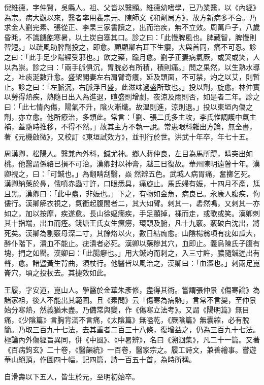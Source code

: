 \begin{pinyinscope}
倪維德，字仲賢，吳縣人。祖、父皆以醫顯。維德幼嗜學，已乃業醫，以《內經》為宗。病大觀以來，醫者率用裴宗元、陳師文《和劑局方》，故方新病多不合。乃求金人劉完素、張從正、李杲三家書讀之，出而治疾，無不立效。周萬戶子，八歲昏眊，不識饑飽寒暑，以土炭自塞其口。診之曰：「此慢脾風也。脾藏智，脾慢則智短。」以疏風助脾劑投之，即愈。顧顯卿右耳下生癭，大與首同，痛不可忍。診之曰：「此手足少陽經受邪也。」飲之藥，踰月愈。劉子正妻病氣厥，或哭或笑，人以為崇。診之曰：「兩手脈俱沉，胃脘必有所積，積則痛。」問之果然，以生熟水導之，吐痰涎數升愈。盛架閣妻左右肩臂奇癢，延及頭面，不可禁，灼之以艾，則暫止。診之曰：「左脈沉，右脈浮且盛，此滋味過盛所致也。」投以劑，旋愈。林仲實以勞得熱疾，熱隨日出入為進退，暄盛則增劇，夜涼及雨則否，如是者二年。診之曰：「此七情內傷，陽氣不升，陰火漸熾。故溫則進，涼則退。」投以東垣內傷之劑，亦立愈。他所療治，多類此。常言：「劉、張二氏多主攻，李氏惟調護中氣主補，蓋隨時推移，不得不然。」故其主方不執一說。常患眼科雜出方論，無全書，著《元機啟微》，又校訂《東垣試效方》，並刊行於世。洪武十年卒，年七十五。

周漢卿，松陽人。醫兼內外科，鍼尤神。鄉人蔣仲良，左目為馬所踶，睛突出如桃。他醫謂係絡已損不可治。漢卿封以神膏，越三日復故。華州陳明遠瞽十年。漢卿視之，曰：「可鍼也。」為翻睛刮翳，焱然辨五色。武城人病胃痛，奮擲乞死。漢卿納藥於鼻，俄噴赤蟲寸許，口眼悉具，痛旋止。馬氏婦有娠，十四月不產，尪且黑。漢卿曰：「此中蠱，非娠也。」下之，有物如金魚，病良已。永康人腹疾，佝僂行。漢卿解衣視之，氣衝起腹間者二，其大如臂。刺其一，砉然鳴，又刺其一亦如之，加以按摩，疾遂愈。長山徐嫗癇疾，手足顫掉，裸而走，或歌或笑。漢卿刺其十指端，出血而痊。錢塘王氏女生瘰癆，環頭及腑，凡十九竅。竅破白沈出，將死矣。漢卿為剔竅母深二寸，其餘烙以火，數日結痂愈。山陰楊翁項有疣如瓜大，醉仆階下，潰血不能止。疣潰者必死。漢卿以藥糝其穴，血即止。義烏陳氏子腹有塊，捫之如罌。漢卿曰：「此腸癰也。」用大鍼灼而刺之，入三寸許，膿隨鍼迸出有聲，愈。諸暨黃生背曲，須杖行。他醫皆以風治之，漢卿曰：「血澀也。」刺兩足崑崙穴，頃之投杖去。其捷效如此。

王履，字安道，崑山人。學醫於金華朱彥修，盡得其術。嘗謂張仲景《傷寒論》為諸家祖，後人不能出其範圍。且《素問》云「傷寒為病熱」，言常不言變，至仲景始分寒熱，然義猶未盡。乃備常與變，作《傷寒立法考》。又謂《陽明篇》無目痛，《少陰篇》言胸背滿不言痛，《太陰篇》無嗌乾，《厥陰篇》無囊縮，必有脫簡。乃取三百九十七法，去其重者二百三十八條，復增益之，仍為三百九十七法。極論內外傷經旨異同，併《中風》、《中暑辨》，名曰《溯洄集》，凡二十一篇。又著《百病鉤玄》二十卷，《醫韻統》一百卷，醫家宗之。履工詩文，兼善繪事。嘗遊華山絕頂，作圖四十幅，記四篇，詩一百五十首，為時所稱。

自滑壽以下五人，皆生於元，至明初始卒。


\end{pinyinscope}
